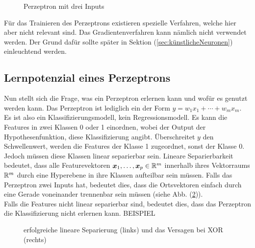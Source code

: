 \para{}
\begin{figure}[h!]
  \centering
  \caption{Perzeptron mit drei Inputs}
  \label{fi:perzeptron}
\end{figure}
\para{}
Für das Trainieren des Perzeptrons existieren spezielle Verfahren, welche hier
aber nicht relevant sind. Das Gradientenverfahren kann nämlich nicht verwendet
werden. Der Grund dafür sollte später in Sektion (\ref{sec:künstlicheNeuronen}) einleuchtend werden.

\cite{wiki:perzeptron}
\cite{Nielsen}

\subsection{Lernpotenzial eines Perzeptrons}
Nun stellt sich die Frage, was ein Perzeptron erlernen kann und wofür es genutzt werden kann.
Das Perzeptron ist lediglich ein  der Form
$y = w_1x_1 + \cdots + w_m x_m$. Es ist also ein Klassifizierungsmodell, kein Regressionsmodell.
Es kann die Features in zwei Klassen 0 oder 1 einordnen, wobei der Output der
Hypothesenfunktion, diese Klassifizierung angibt.
Überschreitet $y$ den Schwellenwert, werden die Features der Klasse 1 zugeordnet, sonst
der Klasse 0.
Jedoch müssen diese Klassen linear separierbar sein.
\para{}
Lineare Separierbarkeit bedeutet, dass alle Featurevektoren $\bm{x}_1,\ldots,\bm{x}_p \in \mathbb{R}^m$
innerhalb ihres Vektorraums $\mathbb{R}^m$ durch eine Hyperebene in ihre Klassen aufteilbar sein müssen.
Falls das Perzeptron zwei Inputs hat, bedeutet dies, dass die Ortsvektoren
einfach durch eine Gerade voneinander trennenbar sein müssen (siehe Abb.
(\ref{fig:linearer_Klassifikator})). \\
Falls die Features nicht linear separierbar sind, bedeutet dies, dass das
Perzeptron die Klassifizierung nicht erlernen kann.
BEISPIEL
\\
\begin{figure}[h!]
  \caption{erfolgreiche lineare Separierung (links) und das Versagen bei XOR (rechts)}
  \label{fig:linearer_Klassifikator}
\end{figure}
\para{}
\cite{wiki:perzeptron}
\cite{wiki:linear_separability}

